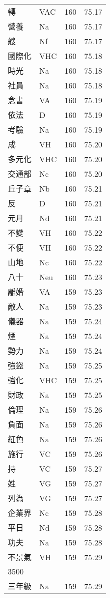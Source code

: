 \documentclass[twocolumn]{book}
\begin{document}
\begin{supertabular}{llrr}
轉 & VAC & 160 &  75.17\\
營養 & Na & 160 &  75.17\\
艘 & Nf & 160 &  75.17\\
國際化 & VHC & 160 &  75.18\\
時光 & Na & 160 &  75.18\\
社員 & Na & 160 &  75.18\\
念書 & VA & 160 &  75.19\\
依法 & D & 160 &  75.19\\
考驗 & Na & 160 &  75.19\\
成 & VH & 160 &  75.20\\
多元化 & VHC & 160 &  75.20\\
交通部 & Nc & 160 &  75.20\\
丘子章 & Nb & 160 &  75.21\\
反 & D & 160 &  75.21\\
元月 & Nd & 160 &  75.21\\
不變 & VH & 160 &  75.22\\
不便 & VH & 160 &  75.22\\
山地 & Nc & 160 &  75.22\\
八十 & Neu & 160 &  75.23\\
離婚 & VA & 159 &  75.23\\
敵人 & Na & 159 &  75.23\\
儀器 & Na & 159 &  75.24\\
煙 & Na & 159 &  75.24\\
勢力 & Na & 159 &  75.24\\
強盜 & Na & 159 &  75.25\\
強化 & VHC & 159 &  75.25\\
財政 & Na & 159 &  75.25\\
倫理 & Na & 159 &  75.26\\
負面 & Na & 159 &  75.26\\
紅色 & Na & 159 &  75.26\\
施行 & VC & 159 &  75.26\\
持 & VC & 159 &  75.27\\
姓 & VG & 159 &  75.27\\
列為 & VG & 159 &  75.27\\
企業界 & Nc & 159 &  75.28\\
平日 & Nd & 159 &  75.28\\
功夫 & Na & 159 &  75.28\\
不景氣 & VH & 159 &  75.29\\
3500\\
三年級 & Na & 159 &  75.29\\

\end{supertabular}
\end{document}
